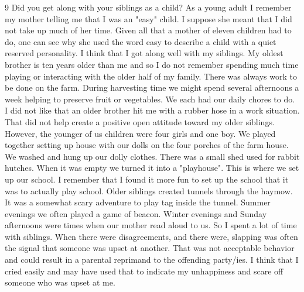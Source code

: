 9 Did you get along with your siblings as a child?
As a young adult I remember my mother telling me that I was an "easy" child. I suppose she meant that I did not take up much of her time. Given all that a mother of eleven children had to do, one can see why she used the word easy to describe a child with a quiet reserved personality. I think that I got along well with my siblings. 
My oldest brother is ten years older than me and so I do not remember spending much time playing or interacting with the older half of my family. There was always work to be done on the farm. During harvesting time we might spend several afternoons a week helping to preserve fruit or vegetables. We each had our daily chores to do. I did not like that an older brother hit me with a rubber hose in a work situation. That did not help create a positive open attitude toward my older siblings.
However, the younger of us children were four girls and one boy. We played together setting up house with our dolls on the four porches of the farm house. We washed and hung up our dolly clothes. There was a small shed used for rabbit hutches.  When it was empty we turned it into a "playhouse". This is where we set up our school. I remember that I found it more fun to set up the school that it was to actually play school. Older siblings created tunnels through the haymow. It was a somewhat scary adventure to play tag inside the tunnel. Summer evenings we often played a game of beacon. Winter evenings and Sunday afternoons were times when our mother read aloud to us. 
So I spent a lot of time with siblings. When there were disagreements, and there were, slapping was often the signal that someone was upset at another. That was not acceptable behavior and could result in a parental reprimand to the offending party/ies. I think that I cried easily and may have used that to indicate my unhappiness and scare off someone who was upset at me. 




